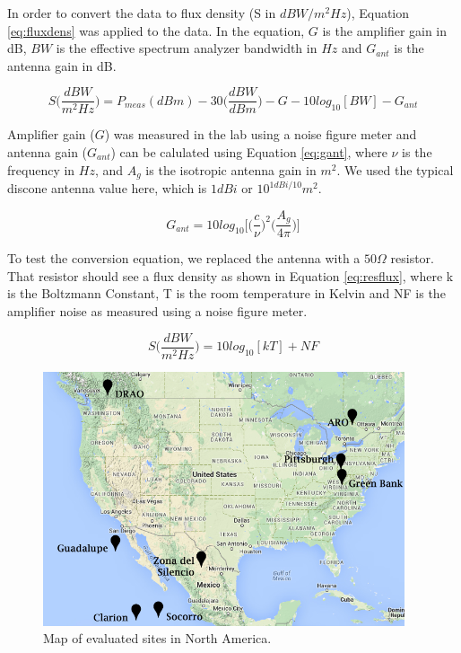 In order to convert the data to flux density (S in $dBW/m^2Hz$), Equation \ref{eq:fluxdens} was applied to the data. In the equation, $G$ is the amplifier gain in dB, $BW$ is the effective spectrum analyzer bandwidth in $Hz$ and $G_{ant}$ is the antenna gain in dB. 

\begin{equation}\label{eq:fluxdens}
S \Bigg( \frac{dBW}{m^2 Hz} \Bigg) = P_{meas} (dBm) - 30 \Bigg( \frac{dBW}{dBm} \Bigg) - G - 10log_{10} [BW] - G_{ant}
\end{equation}

Amplifier gain ($G$) was measured in the lab using a noise figure meter and antenna gain ($G_{ant}$) can be calulated using Equation \ref{eq:gant}, where $\nu$ is the frequency in $Hz$, and $A_g$ is the isotropic antenna gain in $m^2$. We used the typical discone antenna value here, which is $1 dBi$ or $10^{1dBi/10} m^2$. 

\begin{equation}\label{eq:gant}
G_{ant}= 10 log_{10} \Bigg[ \Bigg(\frac{c}{\nu} \Bigg)^2 \Bigg( \frac{A_g}{4 \pi} \Bigg) \Bigg]
\end{equation}

To test the conversion equation, we replaced the antenna with a $50 \Omega$ resistor. That resistor should see a flux density as shown in Equation \ref{eq:resflux}, where k is the Boltzmann Constant, T is the room temperature in Kelvin and NF is the amplifier noise as measured using a noise figure meter. 

\begin{equation}\label{eq:resflux}
S \Bigg( \frac{dBW}{m^2 Hz} \Bigg) = 10 log_{10} [k T] + NF 
\end{equation}

\begin{figure}[tb]
\begin{center}
\includegraphics[width=0.95\textwidth]{RFI_testing/figures/large_scale_site_map.jpg}
\caption{Map of evaluated sites in North America.}
\label{Fig:site_map}
\end{center}
\end{figure}

